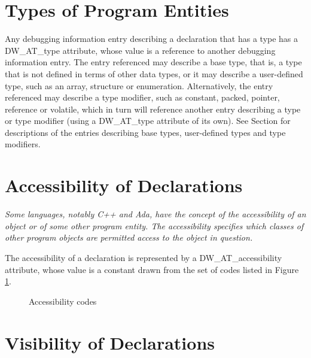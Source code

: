\section{Types of Program Entities}
\label{chap:typesofprogramentities}
Any debugging information entry describing a declaration that
has a type has a DW\-\_AT\-\_type attribute, whose value is a
reference to another debugging information entry. The entry
referenced may describe a base type, that is, a type that is
not defined in terms of other data types, or it may describe a
user-defined type, such as an array, structure or enumeration.
Alternatively, the entry referenced may describe a type
modifier, such as constant, packed, pointer, reference or
volatile, which in turn will reference another entry describing
a type or type modifier (using a DW\-\_AT\-\_type attribute of its
own). See 
Section   
for descriptions of the entries describing
base types, user-defined types and type modifiers.



\section{Accessibility of Declarations}
\label{chap:accessibilityofdeclarations}
\textit{Some languages, notably C++ and Ada, have the concept of
the accessibility of an object or of some other program
entity. The accessibility specifies which classes of other
program objects are permitted access to the object in question.}

The accessibility of a declaration is represented by a DW\_AT\_accessibility attribute, whose
value is a constant drawn from the set of codes listed in Figure 
\ref{fig:accessibilitycodes}.

\begin{figure}[here]
\begin{description}
\centering
\item [DW\_ACCESS\_public]
\item [DW\_ACCESS\_private]
\item [DW\_ACCESS\_protected]
\end{description}
\caption{Accessibility codes}
\label{fig:accessibilitycodes}
\end{figure}

\section{Visibility of Declarations}
\label{chap:visibilityofdeclarations}

